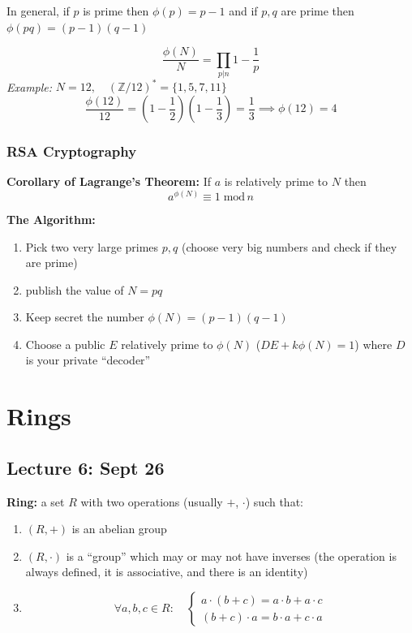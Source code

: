 \documentclass[12pt]{report}
\newcommand{\Z}{\mathbb{Z}}
\renewcommand{\mod}{\; \text{mod}\, }
\begin{document}
In general, if $p$ is prime then $\phi(p) = p -1$ and if $p, q$ are prime then $\phi(pq) = (p - 1)(q - 1)$

\[\boxed{\frac{\phi(N)}{N} = \prod_{p | n} 1 - \frac{1}{p}}\]
\emph{Example:} $N=12, \quad (\Z/12)^* = \{1, 5, 7, 11\}$
\[\frac{\phi(12)}{12} = (1 - \frac{1}{2})(1 - \frac{1}{3}) = \frac{1}{3} \implies \phi(12) = 4\]

\subsection*{RSA Cryptography}
\textbf{Corollary of Lagrange's Theorem:} If $a$ is relatively prime to $N$ then 
\[a^{\phi(N)} \equiv 1 \mod n\]

\textbf{The Algorithm:}
\begin{enumerate}
    \item Pick two very large primes $p, q$ (choose very big numbers and check if they are prime)
    \item publish the value of $N = pq$ 
    \item Keep secret the number $\phi(N) = (p-1)(q-1)$
    \item Choose a public $E$ relatively prime to $\phi(N)$ ($DE + k\phi(N) = 1$) where $D$ is your private ``decoder''
\end{enumerate}

\chapter*{Rings}
\section*{Lecture 6: Sept 26}
\textbf{Ring:} a set $R$ with two operations (usually $+$, \; $\cdot$) such that:
\begin{enumerate}
    \item $(R, +)$ is an abelian group 
    \item $(R, \cdot)$ is a ``group'' which may or may not have inverses (the operation is always defined, it is associative, and there is an identity) 
    \item 
    \[\forall a, b, c \in R : \quad \begin{cases}
        a \cdot (b + c) = a\cdot b + a \cdot c\\
        (b + c) \cdot a = b\cdot a + c\cdot a
    \end{cases}\]
\end{enumerate}
\end{document}
